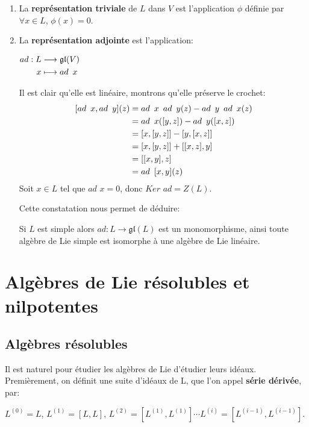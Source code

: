 \documentclass[a4paper,openany,12pt]{report}
\newcommand{\gl}{\mathfrak{gl}}
\theoremstyle{break}
{\theorembodyfont{\upshape}
\newtheorem*{rmq}{Remarque :}
\newtheorem*{prv}{Preuve :}
\newtheorem*{ex}{Exemples :}
\newtheorem*{exe}{Exemple : }
\newtheorem*{nota}{Notation :}
\newtheorem*{dem}{D\'emonstration :}}
\begin{document}
\begin{ex}
\begin{enumerate}

\item La \textbf{représentation triviale} de $L$ dans $V$ est l'application $\phi$ définie par $\forall x \in L$, $\phi(x)=0$.

\item La \textbf{représentation adjointe} est l'application:
\begin{center}
$
\begin{aligned}
ad : L & \longrightarrow \gl(V) \\
x & \longmapsto ad \enskip x 
\end{aligned}$
\end{center}
Il est clair qu'elle est linéaire, montrons qu'elle préserve le crochet:
\[
\begin{aligned}
[ad \enskip x, ad \enskip y](z) & = ad \enskip x \enskip ad \enskip y(z)- ad \enskip y \enskip ad \enskip x(z) \\
& = ad \enskip x([y,z])-ad \enskip y([x,z]) \\
& = [x,[y,z]]-[y,[x,z]] \\
& = [x,[y,z]]+[[x,z],y] \\
& = [[x,y],z] \\
& = ad \enskip [x,y](z)
\end{aligned} \]
Soit $x \in L$ tel que $ad$ $x = 0$, donc $Ker$ $ad = Z(L)$. 

Cette constatation nous permet de déduire:
\medskip

\quad Si $L$ est simple alors $ad: L \longrightarrow \gl(L)$ est un monomorphisme, ainsi toute algèbre de Lie simple est isomorphe à une algèbre de Lie linéaire.
\end{enumerate}
\end{ex}

\section{Algèbres de Lie résolubles et nilpotentes}

\subsection{Algèbres résolubles}\label{d}

\quad Il est naturel pour étudier les algèbres de Lie d'étudier leurs idéaux. Premièrement, on définit une suite d'idéaux de L, que l'on appel \textbf{série dérivée}, par:
\begin{center}
$L^{(0)} = L$, $L^{(1)} = [L,L]$, $L^{(2)} = [L^{(1)},L^{(1)}] \cdots L^{(i)} = [L^{(i-1)},L^{(i-1)}]$.
\end{center}
\end{document}
